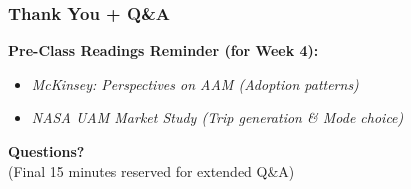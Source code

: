 \documentclass{beamer}
\begin{document}
\begin{frame}[t]
  \frametitle{Thank You + Q\&A}
  
  \textbf{Pre-Class Readings Reminder (for Week 4):}
  \begin{itemize}
      \item \textit{McKinsey: Perspectives on AAM (Adoption patterns)}
      \item \textit{NASA UAM Market Study (Trip generation \& Mode choice)}
  \end{itemize}
  
  \vspace{1cm}
  \begin{center}
      \textbf{Questions?} \\
      \small (Final 15 minutes reserved for extended Q\&A)
  \end{center}
\end{frame}
\end{document}

